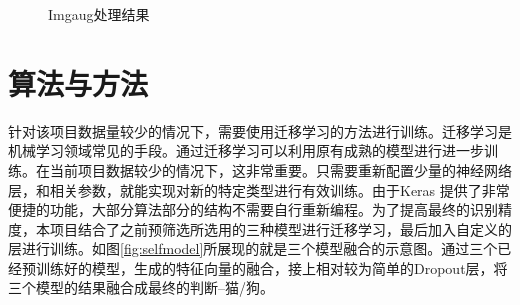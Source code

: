 \documentclass[a4paper,11pt]{article}
\begin{document}
\begin{figure}[htb]
{\label{fig:cat4}
}
\caption{Imgaug处理结果}
\label{fig:cats}
\end{figure}


\section{算法与方法}
\label{sec:org7de32bb}
针对该项目数据量较少的情况下，需要使用迁移学习的方法进行训练。迁移学习是机械学习领域常见的手段。通过迁移学习可以利用原有成熟的模型进行进一步训练。在当前项目数据较少的情况下，这非常重要。只需要重新配置少量的神经网络层，和相关参数，就能实现对新的特定类型进行有效训练。由于Keras \cite{Ketkar_2017} 提供了非常便捷的功能，大部分算法部分的结构不需要自行重新编程。为了提高最终的识别精度，本项目结合了之前预筛选所选用的三种模型进行迁移学习，最后加入自定义的层进行训练。如图\ref{fig:selfmodel}所展现的就是三个模型融合的示意图。通过三个已经预训练好的模型，生成的特征向量的融合，接上相对较为简单的Dropout层，将三个模型的结果融合成最终的判断--猫/狗。
\end{document}
